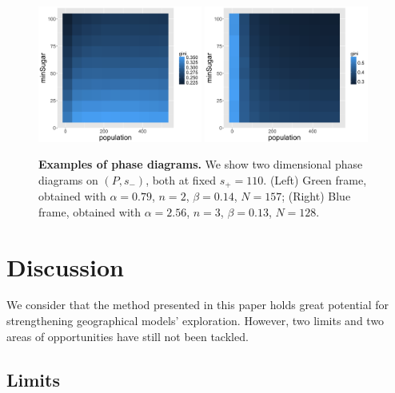 \documentclass[preprint,5p,times,twocolumn,authoryear]{elsarticle}
\begin{document}
\begin{figure}
\centering
\includegraphics[width=0.48\textwidth]{figures/phasediagram_id27_maxSugar110}
\includegraphics[width=0.48\textwidth]{figures/phasediagram_id0_maxSugar110}
\caption{\textbf{Examples of phase diagrams.} We show two dimensional phase diagrams on $(P,s_-)$, both at fixed $s_+ = 110$. (Left) Green frame, obtained with $\alpha = 0.79$, $n=2$, $\beta = 0.14$, $N=157$; (Right) Blue frame, obtained with $\alpha = 2.56$, $n=3$, $\beta = 0.13$, $N=128$.}
\label{fig:sugarscape-phasediagrams}
\end{figure}


\section{Discussion}

We consider that the method presented in this paper holds great potential for strengthening geographical models' exploration. However, two limits and two areas of opportunities have still not been tackled. 

\subsection{Limits}
\end{document}

